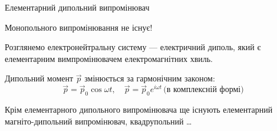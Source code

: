 \documentclass[9pt]{beamer}
\let\vect\vec
\begin{document}
\begin{frame}{Елементарний дипольний випромінювач}{}
	\begin{alertblock}{}\centering
		Монопольного випромінювання не існує!
	\end{alertblock}

	Розглянемо електронейтральну систему --- електричний диполь, який є елементарним вимпромінювачем електромагнітних хвиль.
	\begin{center}
	\end{center}

	Дипольний момент $ \vect{p} $ змінюється за гармонічним законом:
	\begin{equation*}
		\vect{p} = \vect{p}_0 \cos\omega t, \quad 	\vect{p} = \vect{p}_0e^{i\omega t}\, \text{(в комплексній формі)}
	\end{equation*}

	\begin{block}{}
		Крім елементарного дипольного випромінювача ще існують елементарний магніто-дипольний випромінювач, квадрупольний \ldots
	\end{block}
\end{frame}
\end{document}
